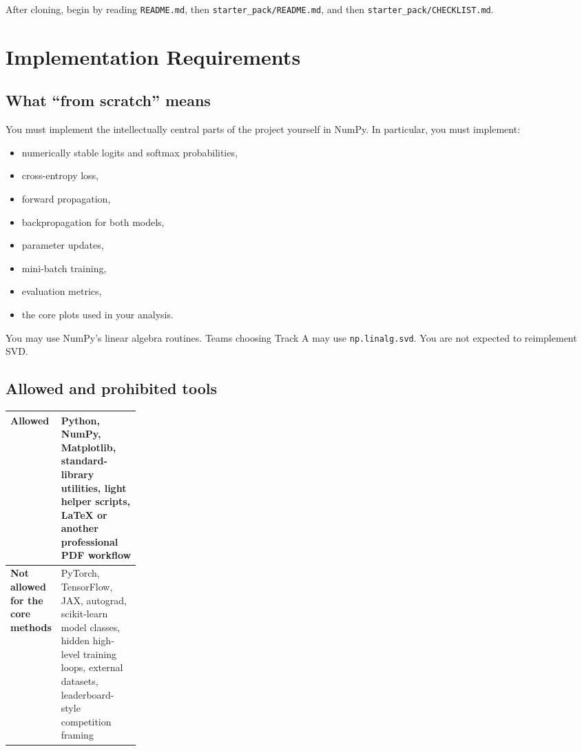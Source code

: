 \documentclass[11pt]{article}
\newcommand{\filepath}[1]{\nolinkurl{#1}}
\begin{document}
After cloning, begin by reading \filepath{README.md}, then \filepath{starter_pack/README.md}, and then \filepath{starter_pack/CHECKLIST.md}.

\section{Implementation Requirements}

\subsection{What ``from scratch'' means}

You must implement the intellectually central parts of the project yourself in NumPy. In particular, you must implement:

\begin{itemize}
    \item numerically stable logits and softmax probabilities,
    \item cross-entropy loss,
    \item forward propagation,
    \item backpropagation for both models,
    \item parameter updates,
    \item mini-batch training,
    \item evaluation metrics,
    \item the core plots used in your analysis.
\end{itemize}

You may use NumPy's linear algebra routines. Teams choosing Track A may use \verb|np.linalg.svd|. You are not expected to reimplement SVD.

\subsection{Allowed and prohibited tools}

\begin{tabularx}{\linewidth}{>{\raggedright\arraybackslash}p{0.22\linewidth} >{\raggedright\arraybackslash}X}
\toprule
\textbf{Allowed} & Python, NumPy, Matplotlib, standard-library utilities, light helper scripts, LaTeX or another professional PDF workflow \\
\midrule
\textbf{Not allowed for the core methods} & PyTorch, TensorFlow, JAX, autograd, scikit-learn model classes, hidden high-level training loops, external datasets, leaderboard-style competition framing \\
\bottomrule
\end{tabularx}
\end{document}
